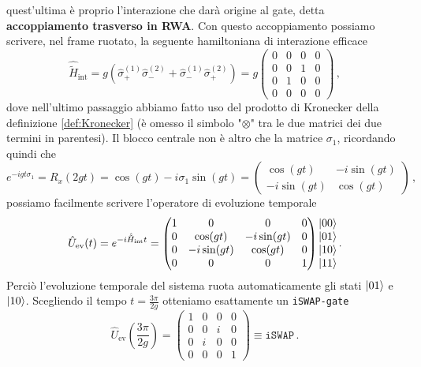 quest'ultima è proprio l'interazione che darà origine al gate, detta \textbf{accoppiamento trasverso in RWA}. Con questo accoppiamento possiamo scrivere, nel frame ruotato, la seguente hamiltoniana di interazione efficace 
\begin{equation*}
    \hat{\tilde{H}}_{\text{int}} = g \left( \hat{\sigma}_+^{(1)} \hat{\sigma}_-^{(2)} + \hat{\sigma}_-^{(1)} \hat{\sigma}_+^{(2)} \right) = g
    \begin{pmatrix}
        0 & 0 & 0 & 0 \\
        0 & 0 & 1 & 0 \\
        0 & 1 & 0 & 0 \\
        0 & 0 & 0 & 0
    \end{pmatrix} \, ,
\end{equation*}
dove nell'ultimo passaggio abbiamo fatto uso del prodotto di Kronecker della definizione \ref{def:Kronecker} (è omesso il simbolo "$\otimes$" tra le due matrici dei due termini in parentesi). Il blocco centrale non è altro che la matrice $\sigma_1$, ricordando quindi che 
\begin{equation}\label{matr_sigma1}
    e^{-i g t \sigma_1} = R_x(2 g t) = \cos (gt)  - i \sigma_1 \sin (gt) =
    \begin{pmatrix}
        \cos (gt) & - i \sin (gt) \\
        - i \sin (gt) & \cos (gt)
    \end{pmatrix}
     \, ,
\end{equation}
possiamo facilmente scrivere l'operatore di evoluzione temporale
\begin{equation*}
    \hat{U}_{\text{ev}}(t) = e^{-i \hat{\tilde{H}}_\text{int} t} = 
    \begin{pmatrix}
        1 & 0 & 0 & 0 \\
        0 & \cos(gt) & -i\sin(gt) & 0 \\
        0 & -i\sin(gt) & \cos(gt) & 0 \\
        0 & 0 & 0 & 1
    \end{pmatrix} 
    \begin{matrix}
        \ket{00} \\ \ket{01} \\ \ket{10} \\ \ket{11}
    \end{matrix} \, .
\end{equation*}
Perciò l'evoluzione temporale del sistema ruota automaticamente gli stati $\ket{01}$ e $\ket{10}$. Scegliendo il tempo $t = \frac{3 \pi}{2 g}$ otteniamo esattamente un \texttt{iSWAP-gate}
\begin{equation*}
    \hat{U}_{\text{ev}} \! \left( \frac{3 \pi}{2 g} \right) = \begin{pmatrix}
        1 & 0 & 0 & 0 \\
        0 & 0 & i & 0 \\
        0 & i & 0 & 0 \\
        0 & 0 & 0 & 1
    \end{pmatrix} \equiv \texttt{iSWAP} \, .
\end{equation*}

